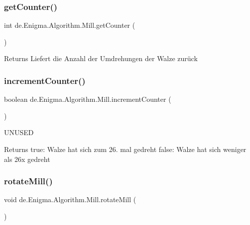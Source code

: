 \subsubsection{\texorpdfstring{get\+Counter()}{getCounter()}}
{\footnotesize\ttfamily int de.\+Enigma.\+Algorithm.\+Mill.\+get\+Counter (\begin{DoxyParamCaption}{ }\end{DoxyParamCaption})}

\begin{DoxyReturn}{Returns}
Liefert die Anzahl der Umdrehungen der Walze zurück 
\end{DoxyReturn}
\mbox{\label{classde_1_1_enigma_1_1_algorithm_1_1_mill_aae7227370833f461949d06851d5bacfc}} 
\subsubsection{\texorpdfstring{increment\+Counter()}{incrementCounter()}}
{\footnotesize\ttfamily boolean de.\+Enigma.\+Algorithm.\+Mill.\+increment\+Counter (\begin{DoxyParamCaption}{ }\end{DoxyParamCaption})}

U\+N\+U\+S\+ED \begin{DoxyReturn}{Returns}
true\+: Walze hat sich zum 26. mal gedreht false\+: Walze hat sich weniger als 26x gedreht 
\end{DoxyReturn}
\mbox{\label{classde_1_1_enigma_1_1_algorithm_1_1_mill_ae84e4853d3e2d32451a85a6cc8c8591d}} 
\subsubsection{\texorpdfstring{rotate\+Mill()}{rotateMill()}}
{\footnotesize\ttfamily void de.\+Enigma.\+Algorithm.\+Mill.\+rotate\+Mill (\begin{DoxyParamCaption}{ }\end{DoxyParamCaption})}


